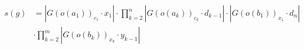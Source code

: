 \documentclass[preview]{standalone}
\begin{document}
\begin{align*}
s(g) &= \left\lvert G(o(a_1))_{c_1} \cdot x_1\right\rvert \cdot \prod_{k=2}^{n}\left\lvert G(o(a_{k}))_{c_{k}} \cdot d_{k-1}\right\rvert \cdot \left\lvert G(o(b_1))_{x_1} \cdot d_{n}\right\rvert \\ &\cdot \prod_{k=2}^{m}\left\lvert G(o(b_{k}))_{x_{k}} \cdot y_{k-1}\right\rvert
\end{align*}
\end{document}
